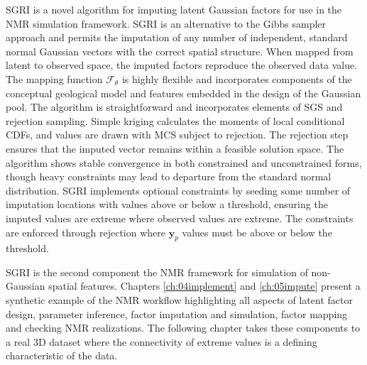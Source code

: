 \Gls{SGRI} is a novel algorithm for imputing latent Gaussian factors for use in the \gls{NMR} simulation framework. \Gls{SGRI} is an alternative to the Gibbs sampler approach and permits the imputation of any number of independent, standard normal Gaussian vectors with the correct spatial structure. When mapped from latent to observed space, the imputed factors reproduce the observed data value. The mapping function $\mathcal{F}_{\theta}$ is highly flexible and incorporates components of the conceptual geological model and features embedded in the design of the Gaussian pool. The algorithm is straightforward and incorporates elements of \gls{SGS} and rejection sampling. Simple kriging calculates the moments of local conditional \glspl{CDF}, and values are drawn with \gls{MCS} subject to rejection. The rejection step ensures that the imputed vector remains within a feasible solution space. The algorithm shows stable convergence in both constrained and unconstrained forms, though heavy constraints may lead to departure from the standard normal distribution. \Gls{SGRI} implements optional constraints by seeding some number of imputation locations with values above or below a threshold, ensuring the imputed values are extreme where observed values are extreme. The constraints are enforced through rejection where $\mathbf{y}_{p}$ values must be above or below the threshold.

\Gls{SGRI} is the second component the \gls{NMR} framework for simulation of non-Gaussian spatial features. Chapters \ref{ch:04implement} and \ref{ch:05impute} present a synthetic example of the \gls{NMR} workflow highlighting all aspects of latent factor design, parameter inference, factor imputation and simulation, factor mapping and checking \gls{NMR} realizations. The following chapter takes these components to a real \gls{3D} dataset where the connectivity of extreme values is a defining characteristic of the data.